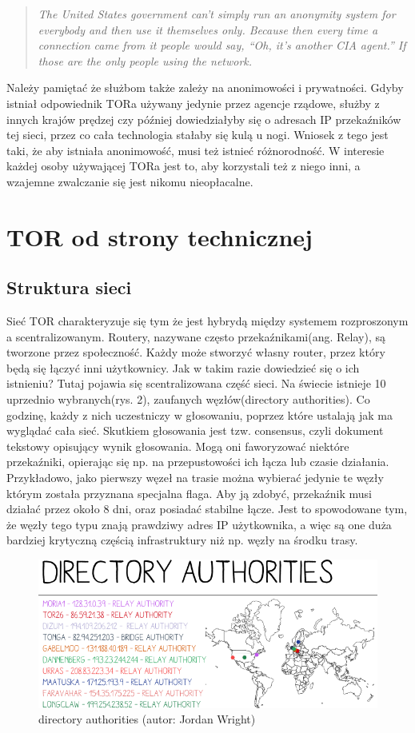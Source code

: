 \documentclass[polish]{kbk}
\begin{document}
\begin{quote}
\textit{The United States government can’t simply run an anonymity system for everybody and then 
use it themselves only. Because then every time a connection came from it people would say, 
``Oh, it’s another CIA agent.'' If those are the only people using the network.}
\end{quote}


Należy pamiętać że służbom także zależy na anonimowości i prywatności. Gdyby istniał 
odpowiednik TORa używany jedynie przez agencje rządowe, służby z innych krajów prędzej 
czy później dowiedziałyby się o adresach IP przekaźników tej sieci, przez co cała
technologia stałaby się kulą u nogi. Wniosek z tego jest taki, że aby istniała 
anonimowość, musi też istnieć różnorodność. W interesie każdej osoby używającej TORa jest to,
aby korzystali też z niego inni, a wzajemne zwalczanie się jest nikomu nieopłacalne.

\section{TOR od strony technicznej}
\subsection{Struktura sieci}
Sieć TOR charakteryzuje się tym że jest hybrydą między systemem rozproszonym a 
scentralizowanym. Routery, nazywane często przekaźnikami(ang. Relay), są tworzone
przez społeczność. Każdy może stworzyć własny router, przez który będą się łączyć 
inni użytkownicy. Jak w takim razie dowiedzieć się o ich istnieniu? Tutaj pojawia 
się scentralizowana część sieci. Na świecie istnieje 10 uprzednio wybranych(rys. 2), 
zaufanych węzłów(directory authorities). Co godzinę, każdy z nich uczestniczy w głosowaniu, 
poprzez które ustalają jak ma wyglądać cała sieć. Skutkiem głosowania jest tzw. 
consensus, czyli dokument tekstowy opisujący wynik głosowania. Mogą oni faworyzować
niektóre przekaźniki, opierając się np. na przepustowości ich łącza lub czasie
działania. Przykładowo, jako pierwszy węzeł na trasie można wybierać jedynie te węzły
którym została przyznana specjalna flaga. Aby ją zdobyć, przekaźnik musi działać
przez około 8 dni, oraz posiadać stabilne łącze. Jest to spowodowane tym, że węzły 
tego typu znają prawdziwy adres IP użytkownika, a więc są one duża bardziej krytyczną
częścią infrastruktury niż np. węzły  na środku trasy.

\begin{figure}
\includegraphics[width=\textwidth]{authorities.png}
\caption{directory authorities (autor:  Jordan Wright\cite{consensus})}
\end{figure}
\end{document}
